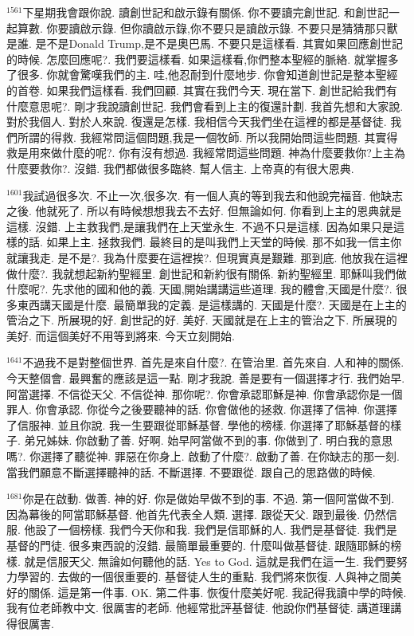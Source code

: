 \documentclass{book}
\begin{document}
$^{1561}$下星期我會跟你說.
讀創世記和啟示錄有關係.
你不要讀完創世記.
和創世記一起算數.
你要讀啟示錄.
但你讀啟示錄,你不要只是讀啟示錄.
不要只是猜猜那只獸是誰.
是不是Donald Trump,是不是奧巴馬.
不要只是這樣看.
其實如果回應創世記的時候.
怎麼回應呢?.
我們要這樣看.
如果這樣看,你們整本聖經的脈絡.
就掌握多了很多.
你就會驚嘆我們的主.
哇,他忍耐到什麼地步.
你會知道創世記是整本聖經的首卷.
如果我們這樣看.
我們回顧.
其實在我們今天.
現在當下.
創世記給我們有什麼意思呢?.
剛才我說讀創世記.
我們會看到上主的復還計劃.
我首先想和大家說.
對於我個人.
對於人來說.
復還是怎樣.
我相信今天我們坐在這裡的都是基督徒.
我們所謂的得救.
我經常問這個問題,我是一個牧師.
所以我開始問這些問題.
其實得救是用來做什麼的呢?.
你有沒有想過.
我經常問這些問題.
神為什麼要救你?上主為什麼要救你?.
沒錯.
我們都做很多臨終.
幫人信主.
上帝真的有很大恩典.

$^{1601}$我試過很多次.
不止一次,很多次.
有一個人真的等到我去和他說完福音.
他缺志之後.
他就死了.
所以有時候想想我去不去好.
但無論如何.
你看到上主的恩典就是這樣.
沒錯.
上主救我們,是讓我們在上天堂永生.
不過不只是這樣.
因為如果只是這樣的話.
如果上主.
拯救我們.
最終目的是叫我們上天堂的時候.
那不如我一信主你就讓我走.
是不是?.
我為什麼要在這裡挨?.
但現實真是艱難.
那到底.
他放我在這裡做什麼?.
我就想起新約聖經里.
創世記和新約很有關係.
新約聖經里.
耶穌叫我們做什麼呢?.
先求他的國和他的義.
天國,開始講講這些道理.
我的體會,天國是什麼?.
很多東西講天國是什麼.
最簡單我的定義.
是這樣講的.
天國是什麼?.
天國是在上主的管治之下.
所展現的好.
創世記的好.
美好.
天國就是在上主的管治之下.
所展現的美好.
而這個美好不用等到將來.
今天立刻開始.

$^{1641}$不過我不是對整個世界.
首先是來自什麼?.
在管治里.
首先來自.
人和神的關係.
今天整個會.
最興奮的應該是這一點.
剛才我說.
善是要有一個選擇才行.
我們始早.
阿當選擇.
不信從天父.
不信從神.
那你呢?.
你會承認耶穌是神.
你會承認你是一個罪人.
你會承認.
你從今之後要聽神的話.
你會做他的拯救.
你選擇了信神.
你選擇了信服神.
並且你說.
我一生要跟從耶穌基督.
學他的榜樣.
你選擇了耶穌基督的樣子.
弟兄姊妹.
你啟動了善.
好啊.
始早阿當做不到的事.
你做到了.
明白我的意思嗎?.
你選擇了聽從神.
罪惡在你身上.
啟動了什麼?.
啟動了善.
在你缺志的那一刻.
當我們願意不斷選擇聽神的話.
不斷選擇.
不要跟從.
跟自己的思路做的時候.

$^{1681}$你是在啟動.
做善.
神的好.
你是做始早做不到的事.
不過.
第一個阿當做不到.
因為幕後的阿當耶穌基督.
他首先代表全人類.
選擇.
跟從天父.
跟到最後.
仍然信服.
他設了一個榜樣.
我們今天你和我.
我們是信耶穌的人.
我們是基督徒.
我們是基督的門徒.
很多東西說的沒錯.
最簡單最重要的.
什麼叫做基督徒.
跟隨耶穌的榜樣.
就是信服天父.
無論如何聽他的話.
Yes to God.
這就是我們在這一生.
我們要努力學習的.
去做的一個很重要的.
基督徒人生的重點.
我們將來恢復.
人與神之間美好的關係.
這是第一件事.
OK.
第二件事.
恢復什麼美好呢.
我記得我讀中學的時候.
我有位老師教中文.
很厲害的老師.
他經常批評基督徒.
他說你們基督徒.
講道理講得很厲害.
\end{document}
